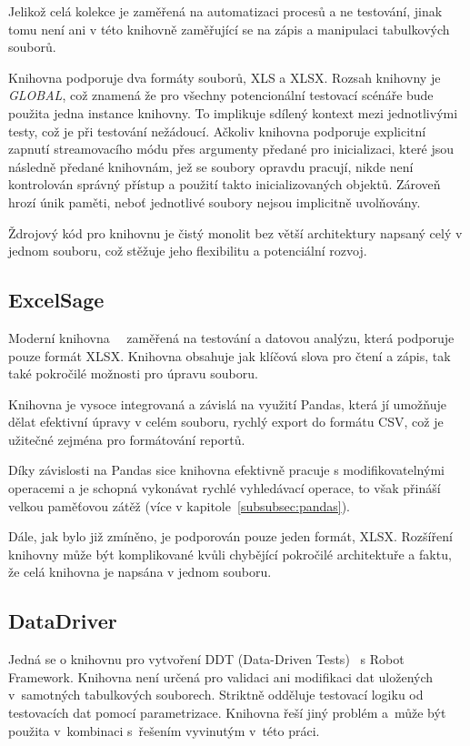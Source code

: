 Jelikož celá kolekce je zaměřená na  automatizaci procesů a ne testování, jinak tomu není ani v této knihovně zaměřující se na zápis a manipulaci tabulkových souborů. 

Knihovna podporuje dva formáty souborů, XLS a XLSX. Rozsah knihovny je \textit{GLOBAL}, což znamená že pro všechny potencionální testovací scénáře bude použita jedna instance knihovny. To implikuje sdílený kontext mezi jednotlivými testy, což je při testování nežádoucí. Ačkoliv knihovna podporuje explicitní zapnutí streamovacího módu přes argumenty předané pro inicializaci, které jsou následně předané knihovnám, jež se soubory opravdu pracují, nikde není kontrolován správný přístup a použití takto inicializovaných objektů. Zároveň hrozí únik paměti, neboť jednotlivé soubory nejsou implicitně uvolňovány. 

Ždrojový kód pro knihovnu je čistý monolit bez větší architektury napsaný celý v jednom souboru, což stěžuje jeho flexibilitu a potenciální rozvoj.

\subsection{ExcelSage}

Moderní knihovna~\cite{ExcelSageGH}~\cite{ExcelSagePyPI} zaměřená na testování a datovou analýzu, která podporuje pouze formát XLSX. Knihovna obsahuje jak klíčová slova pro čtení a zápis, tak také pokročilé možnosti pro úpravu souboru.

Knihovna je vysoce integrovaná a závislá na využití Pandas, která jí umožňuje dělat efektivní úpravy v celém souboru, rychlý export do formátu CSV, což je užitečné zejména pro formátování reportů.

Díky závislosti na Pandas sice knihovna efektivně pracuje s modifikovatelnými operacemi a je schopná vykonávat rychlé vyhledávací operace, to však přináší velkou paměťovou zátěž (více v kapitole~\ref{subsubsec:pandas}).

Dále, jak bylo již zmíněno, je podporován pouze jeden formát, XLSX. Rozšíření knihovny může být komplikované kvůli chybějící pokročilé architektuře a faktu, že celá knihovna je napsána v jednom souboru.

\subsection{DataDriver}

Jedná se o knihovnu pro vytvoření DDT (Data-Driven Tests)~\cite{DataDriver} s Robot Framework. Knihovna není určená pro validaci ani modifikaci dat uložených v~samotných tabulkových souborech. Striktně odděluje testovací logiku od testovacích dat pomocí parametrizace. Knihovna řeší jiný problém a~může být použita v~kombinaci s~řešením vyvinutým v~této práci.

